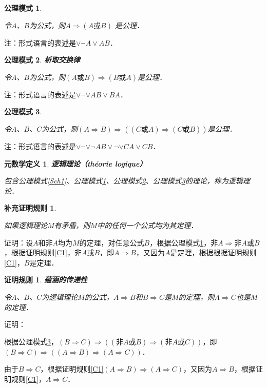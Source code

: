 \documentclass[12pt, a4paper, oneside]{book}
\newtheorem{metadef}{元数学定义}
\newtheorem{C}{证明规则}
\newtheorem{Ccor}{补充证明规则}
\newtheorem{Sch}{公理模式}
\begin{document}
			\begin{Sch}\label{Sch2}
				\hfill\par
				令$A$、$B$为公式，则$A\Rightarrow(A\text{或}B)$ 是公理．
			\end{Sch}
			注：形式语言的表述是$\lor\neg A\lor AB$．
			
			\begin{Sch}\label{Sch3}			
				\textbf{析取交换律}
				\par
				令$A$、$B$为公式，则$(A\text{或}B)\Rightarrow(B\text{或}A)$是公理．
			\end{Sch}			
			注：形式语言的表述是$\lor\neg\lor AB\lor BA$．
			
			\begin{Sch}\label{Sch4}			
				\hfill\par
				令$A$、$B$、$C$为公式，则$(A\Rightarrow B)\Rightarrow((C\text{或}A)\Rightarrow(C\text{或}B))$是公理．
			\end{Sch}
			注：形式语言的表述是$\lor\neg\lor\neg AB\lor\neg\lor CA \lor CB$．
			
			\begin{metadef}
				\textbf{逻辑理论（théorie logique）}
				\par
				包含公理模式\ref{Sch1}、公理模式\ref{Sch2}、公理模式\ref{Sch3}、公理模式\ref{Sch4}的理论，称为逻辑理论．
			\end{metadef}
			
			\begin{Ccor}\label{Ccor2}
				\hfill\par
				如果逻辑理论$M$有矛盾，则$M$中的任何一个公式均为其定理．
			\end{Ccor}
			证明：设$A$和$\text{非}A$均为$M$的定理，对任意公式$B$，根据公理模式\ref{Sch2}，$\text{非}A\Rightarrow \text{非}A\text{或}B$，根据证明规则\ref{C1}，$\text{非}A\text{或}B$，即$A\Rightarrow B$，又因为$A$是定理，根据根据证明规则\ref{C1}，$B$是定理．
			
			\begin{C}\label{C6}			
				\textbf{蕴涵的传递性}
				\par
				令$A$、$B$、$C$为逻辑理论$M$的公式，$A\Rightarrow B$和$B\Rightarrow C$是$M$的定理，则$A\Rightarrow C$也是$M$的定理．
			\end{C}
			证明：
			\par
			根据公理模式\ref{Sch4}，$(B\Rightarrow C)\Rightarrow ((\text{非}A\text{或}B)\Rightarrow (\text{非}A\text{或}C))$，即$(B\Rightarrow C)\Rightarrow ((A\Rightarrow B)\Rightarrow (A\Rightarrow C))$．
			\par
			由于$B\Rightarrow C$，根据证明规则\ref{C1}$(A\Rightarrow B)\Rightarrow (A\Rightarrow C)$，又因为$A\Rightarrow B$，根据证明规则\ref{C1}，$A\Rightarrow C$．
			
\end{document}
